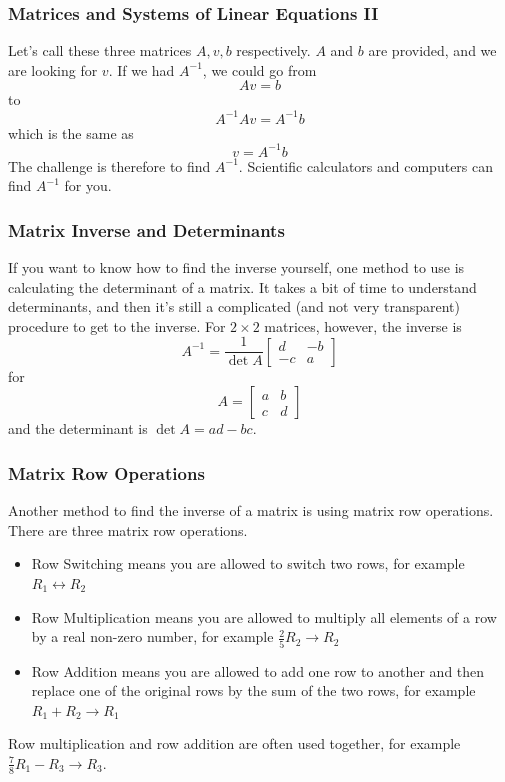 \documentclass[xcolor=dvipsnames]{beamer}
\begin{document}
\begin{frame}
  \frametitle{Matrices and Systems of Linear Equations II}
Let's call these three matrices $A,v,b$ respectively. $A$ and $b$ are
provided, and we are looking for $v$. If we had $A^{-1}$, we could go
from
\begin{equation}
  \label{eq:baixieda}
  Av=b
\end{equation}
to
\begin{equation}
  \label{eq:maethung}
  A^{-1}Av=A^{-1}b
\end{equation}
which is the same as
\begin{equation}
  \label{eq:leighuga}
  v=A^{-1}b
\end{equation}
The challenge is therefore to find $A^{-1}$. Scientific calculators
and computers can find $A^{-1}$ for you. 
\end{frame}

\begin{frame}
  \frametitle{Matrix Inverse and Determinants}
  If you want to know how to find the inverse yourself, one method to
  use is calculating the determinant of a matrix. It takes a bit of
  time to understand determinants, and then it's still a complicated
  (and not very transparent) procedure to get to the inverse. For
  $2\times{}2$ matrices, however, the inverse is
  \begin{equation}
    \label{eq:iephaizu}
    A^{-1}=\frac{1}{\det{}A}\left[
      \begin{array}{cc}
        d & -b \\
        -c & a
      \end{array}\right]
  \end{equation}
for
  \begin{equation}
    \label{eq:sooxaexa}
    A=\left[
      \begin{array}{cc}
        a & b \\
        c & d
      \end{array}\right]
  \end{equation}
and the determinant is $\det{}A=ad-bc$.
\end{frame}

\begin{frame}
  \frametitle{Matrix Row Operations}
  Another method to find the inverse of a matrix is using
  \alert{matrix row operations}. There are three matrix row
  operations.
\begin{itemize}
\item \alert{Row Switching} means you are allowed to switch two rows,
  for example $R_{1}\leftrightarrow{}R_{2}$
\item \alert{Row Multiplication} means you are allowed to multiply all
  elements of a row by a real non-zero number, for example
  $\frac{2}{5}R_{2}\rightarrow{}R_{2}$
\item \alert{Row Addition} means you are allowed to add one row to
  another and then replace one of the original rows by the sum of the
  two rows, for example $R_{1}+R_{2}\rightarrow{}R_{1}$
\end{itemize}
Row multiplication and row addition are often used together, for
example $\frac{7}{8}R_{1}-R_{3}\rightarrow{}R_{3}$.
\end{frame}
\end{document}
